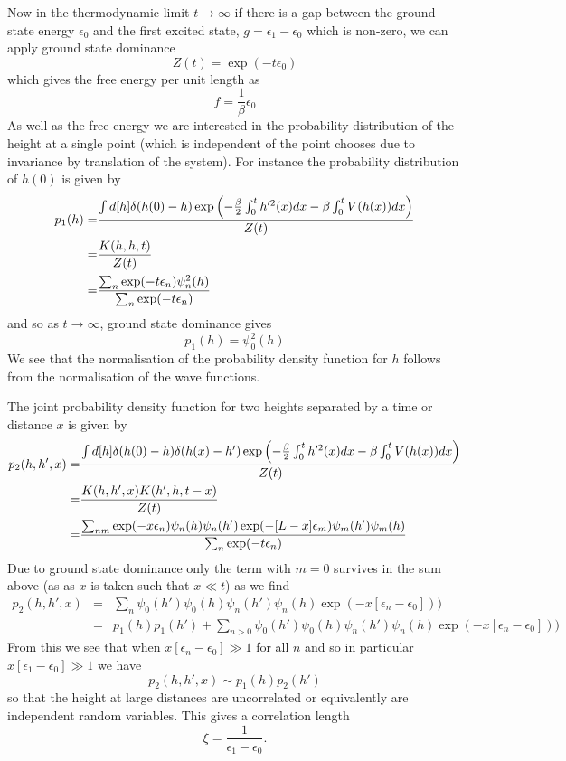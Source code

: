 Now in the thermodynamic limit $t\to\infty$ if there is a gap between the ground state energy
$\epsilon_0$ and the first excited state, $g=\epsilon_1-\epsilon_0$ which is non-zero, we can apply ground state dominance 
\begin{equation}
Z(t) =\exp(-t\epsilon_0)
\end{equation}
which gives the free energy per unit length as
\begin{equation}
f=\frac{1}{\beta}\epsilon_0
\end{equation}
As well as the free energy we are interested in the probability distribution of the height at a single point (which is independent of the point chooses due to invariance by translation of the system). For instance the probability distribution of $h(0)$ is given by
\begin{align}
p_1(h)=& \frac{\int d[h]\delta(h(0)-h)\exp\left(-\frac{\beta}{2}\int_0^t h'^2(x) dx -\beta\int_0^t  V(h(x)) dx\right)}{Z(t)}\nonumber \\
=& \frac{K(h,h,t)}{Z(t)} \nonumber \\
=& \frac{\sum_n \exp(-t\epsilon_n)\psi_n^2(h)}{\sum_n \exp(-t\epsilon_n)}
\end{align}
and so as $t\to\infty$, ground state dominance gives
\begin{equation}
p_1(h)= \psi_0^2(h)
\end{equation}
We see that the normalisation of the probability density function for $h$ follows from the 
normalisation of the wave functions.

The joint probability density function for two heights separated by a time or distance $x$ is given by
\begin{align}
p_2(h,h',x)=& \frac{\int d[h]\delta(h(0)-h)\delta(h(x)-h')\exp\left(-\frac{\beta}{2}\int_0^t h'^2(x) dx -\beta\int_0^t  V(h(x)) dx\right)}{Z(t)}\nonumber \\
=& \frac{K(h,h',x)K(h',h,t-x)}{Z(t)}  \nonumber \\
=& \frac{\sum_{nm} \exp(-x\epsilon_n)\psi_n(h)\psi_n(h')\exp(-[L-x]\epsilon_m)\psi_m(h')\psi_m(h)}{\sum_n \exp(-t\epsilon_n)}
\end{align}
Due to ground state dominance only the term with $m=0$ survives in the sum above (as
as $x$ is taken such that $x\ll t$) as we find
\begin{eqnarray}
p_2(h,h',x) &=& \sum_{n} \psi_0(h')\psi_0(h)\psi_n(h')\psi_n(h)\exp(-x[\epsilon_n-\epsilon_0]))\\
&=& p_1(h)p_1(h') + \sum_{n>0} \psi_0(h')\psi_0(h)\psi_n(h')\psi_n(h)\exp(-x[\epsilon_n-\epsilon_0]))
\label{eqp2}
\end{eqnarray}
From this we see that when $x[\epsilon_n-\epsilon_0] \gg1 $ for all $n$ and so in particular $x[\epsilon_1-\epsilon_0] \gg1$ we have 
\begin{equation}
p_2(h,h',x) \sim p_1(h)p_2(h')
\end{equation}
so that the height at large distances are uncorrelated or equivalently are independent random variables. This gives a correlation length
\begin{equation}
\xi = \frac{1}{\epsilon_1-\epsilon_0}.\label{clq}
\end{equation}

